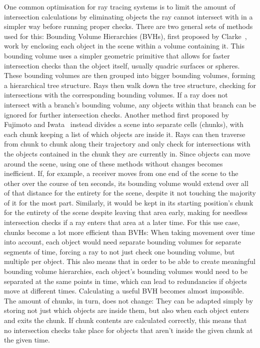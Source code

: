 One common optimisation for ray tracing systems is to limit the amount of intersection calculations by eliminating
objects the ray cannot intersect with in a simpler way before running proper checks.
There are two general sets of methods used for this:
\newline
Bounding Volume Hierarchies (BVHs), first proposed by Clarke~\cite{Cl76},
work by enclosing each object in the scene within a volume containing it.
This bounding volume uses a simpler geometric primitive that allows for faster intersection checks than the object itself,
usually quadric surfaces or spheres.
These bounding volumes are then grouped into bigger bounding volumes, forming a hierarchical tree structure.
Rays then walk down the tree structure, checking for intersections with the corresponding bounding volumes.
If a ray does not intersect with a branch's bounding volume,
any objects within that branch can be ignored for further intersection checks.
\newline
Another method first proposed by Fujimoto and Iwata~\cite{FI85}
instead divides a scene into separate cells (chunks),
with each chunk keeping a list of which objects are inside it.
Rays can then traverse from chunk to chunk along their trajectory
and only check for intersections with the objects contained in the chunk they are currently in.
\newline
Since objects can move around the scene, using one of these methods without changes becomes inefficient.
If, for example, a receiver moves from one end of the scene to the other over the course of ten seconds,
its bounding volume would extend over all of that distance for the entirety for the scene, despite it not touching
the majority of it for the most part.
Similarly, it would be kept in its starting position's chunk for the entirety of the scene despite leaving that area early,
making for needless intersection checks if a ray enters that area at a later time.
\newline
For this use case, chunks become a lot more efficient than BVHs:
When taking movement over time into account, each object would need separate bounding volumes for separate segments of time,
forcing a ray to not just check one bounding volume, but multiple per object.
This also means that in order to be able to create meaningful bounding volume hierarchies,
each object's bounding volumes would need to be separated at the same points in time,
which can lead to redundancies if objects move at different times.
Calculating a useful BVH becomes almost impossible.
\newline
The amount of chunks, in turn, does not change:
They can be adapted simply by storing not just which objects are inside them,
but also when each object enters and exits the chunk.
If chunk contents are calculated correctly,
this means that no intersection checks take place for objects that aren't inside the given chunk at the given time.

